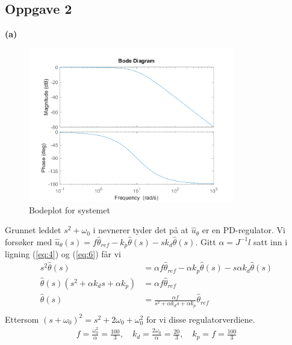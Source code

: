 \documentclass[11pt, a4paper, norsk]{rapport1} %
\begin{document}
\subsection{Oppgave 2}
\textbf{(a)}
\begin{figure}
    \centering
    \includegraphics[width=0.8\textwidth]{figures/oppg2_bode.png}
    \caption{Bodeplot for systemet}
    \label{fig:2}
\end{figure}
Grunnet leddet $s^2+\omega_0$ i nevnerer tyder det på at $\hat{u}_\theta$ er en PD-regulator.
Vi forsøker med $\hat{u}_\theta(s) = f\hat{\theta}_{ref} - k_p\hat{\theta}(s) - sk_d\hat{\theta}(s)$.
Gitt $\alpha = J^{-1}l$ satt inn i ligning (\ref{eq:4}) og (\ref{eq:6}) får vi
\begin{equation}
    \begin{aligned}
        s^2\hat{\theta}(s) &= \alpha f \hat{\theta}_{ref} - \alpha k_p\hat{\theta}(s) - s \alpha k_d \hat{\theta}(s) \\
        \hat{\theta}(s)(s^2 + \alpha k_d s + \alpha k_p) &= \alpha f \hat{\theta}_{ref} \\
        \hat{\theta}(s) &= \frac{\alpha f}{s^2 + \alpha k_d s + \alpha k_p} \hat{\theta}_{ref} \\
    \end{aligned}
\end{equation}
Ettersom $(s+\omega_0)^2 = s^2 + 2\omega_0 + \omega_0^2$ for vi disse regulatorverdiene.
\begin{equation}
    \begin{aligned}
        f = \frac{\omega_0^2}{\alpha} = \frac{100}{3}, \quad k_d = \frac{2\omega_0}{\alpha} = \frac{20}{3}, \quad k_p = f = \frac{100}{3} \\
    \end{aligned}
\end{equation}
\end{document}
